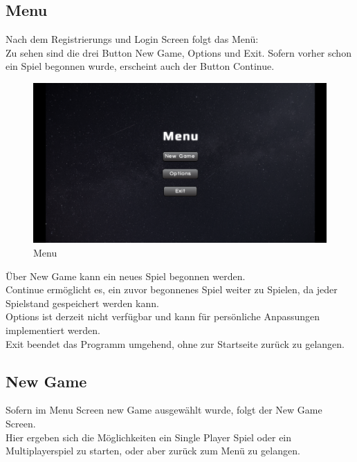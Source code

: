 \documentclass[fontsize=12pt,paper=a4,twoside]{scrartcl}
\begin{document}
\newpage

\subsection{Menu}

Nach dem Registrierungs und Login Screen folgt das Menü:\\
Zu sehen sind die drei Button New Game, Options und Exit. Sofern vorher schon ein Spiel begonnen wurde, erscheint auch der Button Continue.\\

\begin{figure}[htp]
	\centering
	\includegraphics[width=1.00\linewidth]{pics/menuscreen.png}
	\caption{Menu}
	\label{fig1}

\end{figure}

Über New Game kann ein neues Spiel begonnen werden. \\
Continue ermöglicht es, ein zuvor begonnenes Spiel weiter zu Spielen, da jeder Spielstand gespeichert werden kann.\\
Options ist derzeit nicht verfügbar und kann für persönliche Anpassungen implementiert werden. \\
Exit beendet das Programm umgehend, ohne zur Startseite zurück zu gelangen.\\

\newpage
\subsection{New Game}

Sofern im Menu Screen new Game ausgewählt wurde, folgt der New Game Screen.\\
Hier ergeben sich die Möglichkeiten ein Single Player Spiel oder ein Multiplayerspiel zu starten, oder aber zurück zum Menü zu gelangen.\\
\end{document}
